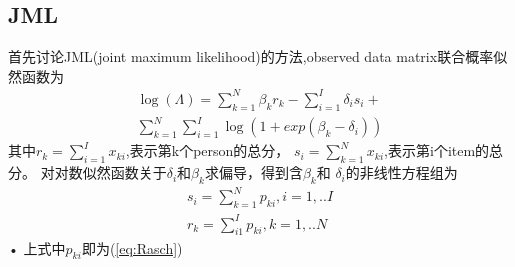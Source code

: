 \documentclass[12pt]{article}
\begin{document}
\subsection{JML}
首先讨论JML(joint maximum likelihood)的方法,observed data matrix联合概率似然函数为
\begin{equation}
\begin{split}
\log(\Lambda)=\sum_{k=1}^N \beta_k r_k -\sum_{i=1}^I \delta_i s_i+ \\
\sum_{k=1}^N \sum_{i=1}^I \log(1+exp(\beta_k-\delta_i))
\end{split}
\end{equation}
其中$r_k=\displaystyle\sum_{i=1}^I x_{ki}$,表示第k个person的总分，
$s_i=\displaystyle\sum_{k=1}^N x_{ki}$,表示第i个item的总分。
对对数似然函数关于$\delta_i$和$\beta_k$求偏导，得到含$\beta_k$和
$\delta_i$的非线性方程组为
\begin{eqnarray}\label{eq:JML}
s_i=\sum_{k=1}^N p_{ki},i=1,..I\\
r_k=\sum_{i1}^I p_{ki},k=1,..N
\end{eqnarray}•
上式中$p_{ki}$即为(\ref{eq:Rasch})
\end{document}
